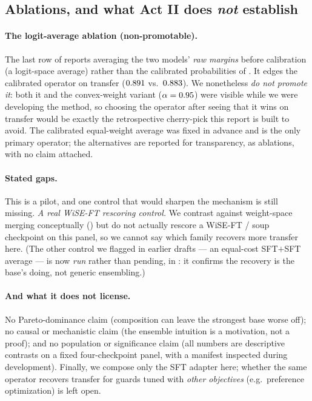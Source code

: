 

\subsection{Ablations, and what Act II does \emph{not} establish}
\label{sec:actIII-ablations}

\paragraph{The logit-average ablation (non-promotable).}
The last row of  reports averaging the two models' \emph{raw margins}
before calibration (a logit-space average) rather than the calibrated probabilities of
. It edges the calibrated operator on transfer ($0.891$ vs.\
$0.883$). We nonetheless \emph{do not promote it}: both it and the convex-weight
variant ($\alpha=0.95$) were visible while we were developing the method, so choosing
the operator after seeing that it wins on transfer would be exactly the retrospective cherry-pick
this report is built to avoid. The calibrated equal-weight average was fixed in advance and is the
only primary operator; the alternatives are reported for transparency, as ablations, with no claim
attached.

\paragraph{Stated gaps.}
This is a pilot, and one control that would sharpen the mechanism is still missing.
\emph{A real WiSE-FT rescoring control.} We contrast against weight-space merging conceptually
(\Cref{sec:actIII-weightspace}) but do not actually rescore a WiSE-FT / soup checkpoint on this panel, so
we cannot say which family recovers more transfer here. (The other control we flagged in earlier drafts ---
an equal-cost SFT$+$SFT average --- is now \emph{run} rather than pending, in \Cref{sec:actIII-sftsft}: it
confirms the recovery is the base's doing, not generic ensembling.)

\paragraph{And what it does not license.}
No Pareto-dominance claim (composition can leave the strongest base worse off); no causal or
mechanistic claim (the ensemble intuition is a motivation, not a proof); and no population or
significance claim (all numbers are descriptive contrasts on a fixed four-checkpoint panel, with a
manifest inspected during development). Finally, we compose only the SFT adapter here; whether the same
operator recovers transfer for guards tuned with \emph{other objectives} (e.g.\ preference optimization)
is left open.

